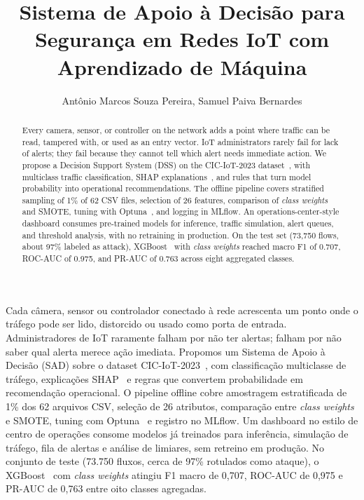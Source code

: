 \documentclass[12pt]{article}
\title{Sistema de Apoio à Decisão para Segurança em Redes IoT com Aprendizado de Máquina}
\author{Antônio Marcos Souza Pereira\inst{1}, Samuel Paiva Bernardes\inst{2}}
\begin{document}
\maketitle

\begin{abstract}
  Every camera, sensor, or controller on the network adds a point where traffic can be read, tampered with, or used as an entry vector.
  IoT administrators rarely fail for lack of alerts; they fail because they cannot tell which alert needs immediate action.
  We propose a Decision Support System (DSS) on the CIC-IoT-2023 dataset~\cite{ciciot2023}, with multiclass traffic classification, SHAP explanations~\cite{lundberg2017}, and rules that turn model probability into operational recommendations.
  The offline pipeline covers stratified sampling of 1\% of 62 CSV files, selection of 26 features, comparison of \textit{class weights} and SMOTE, tuning with Optuna~\cite{akiba2019}, and logging in MLflow.
  An operations-center-style dashboard consumes pre-trained models for inference, traffic simulation, alert queues, and threshold analysis, with no retraining in production.
  On the test set (73,750 flows, about 97\% labeled as attack), XGBoost~\cite{chen2016} with \textit{class weights} reached macro F1 of 0.707, ROC-AUC of 0.975, and PR-AUC of 0.763 across eight aggregated classes.
\end{abstract}

\begin{resumo}
  Cada câmera, sensor ou controlador conectado à rede acrescenta um ponto onde o tráfego pode ser lido, distorcido ou usado como porta de entrada.
  Administradores de IoT raramente falham por não ter alertas; falham por não saber qual alerta merece ação imediata.
  Propomos um Sistema de Apoio à Decisão (SAD) sobre o dataset CIC-IoT-2023~\cite{ciciot2023}, com classificação multiclasse de tráfego, explicações SHAP~\cite{lundberg2017} e regras que convertem probabilidade em recomendação operacional.
  O pipeline offline cobre amostragem estratificada de 1\% dos 62 arquivos CSV, seleção de 26 atributos, comparação entre \textit{class weights} e SMOTE, tuning com Optuna~\cite{akiba2019} e registro no MLflow.
  Um dashboard no estilo de centro de operações consome modelos já treinados para inferência, simulação de tráfego, fila de alertas e análise de limiares, sem retreino em produção.
  No conjunto de teste (73.750 fluxos, cerca de 97\% rotulados como ataque), o XGBoost~\cite{chen2016} com \textit{class weights} atingiu F1 macro de 0,707, ROC-AUC de 0,975 e PR-AUC de 0,763 entre oito classes agregadas.
\end{resumo}
\end{document}
